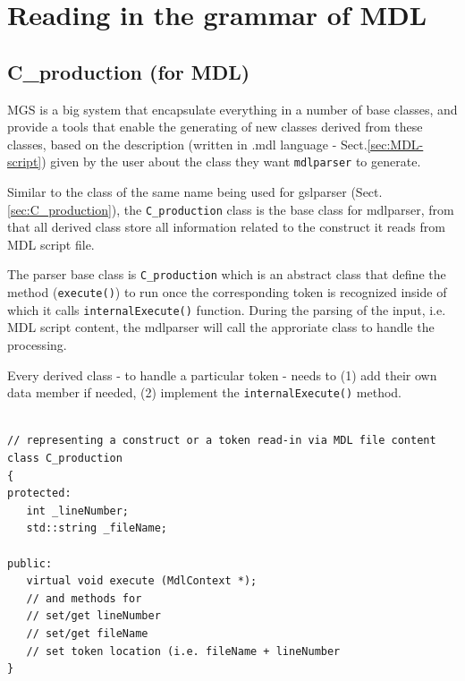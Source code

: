 \section{Reading in the grammar of MDL}
\label{sec:MDL-code-folder}

\subsection{C\_production (for MDL)}
\label{sec:C_production-MDL}


MGS is a big system that encapsulate everything in a number of base classes, and
provide a tools that enable the generating of new classes derived from these
classes, based on the description (written in .mdl language -
Sect.\ref{sec:MDL-script}) given by the user about the class they want
\verb!mdlparser! to generate.

Similar to the class of the same name being used for gslparser
(Sect.\ref{sec:C_production}), the \verb!C_production! class is the base class
for mdlparser, from that all derived class store all information related to the
construct it reads from MDL script file.

The parser base class is \verb!C_production! which is an abstract class that
define the method (\verb!execute()!) to run once the corresponding token is
recognized inside of which it calls \verb!internalExecute()! function.
During the parsing of the input, i.e. MDL script content, the mdlparser will
call the approriate class to handle the processing.


Every derived class - to handle a particular token - needs to (1) add their own data
member if needed, (2) implement the \verb!internalExecute()! method.
\begin{verbatim}

// representing a construct or a token read-in via MDL file content
class C_production
{
protected:
   int _lineNumber;
   std::string _fileName;

public:
   virtual void execute (MdlContext *);
   // and methods for
   // set/get lineNumber
   // set/get fileName
   // set token location (i.e. fileName + lineNumber
}

\end{verbatim}


